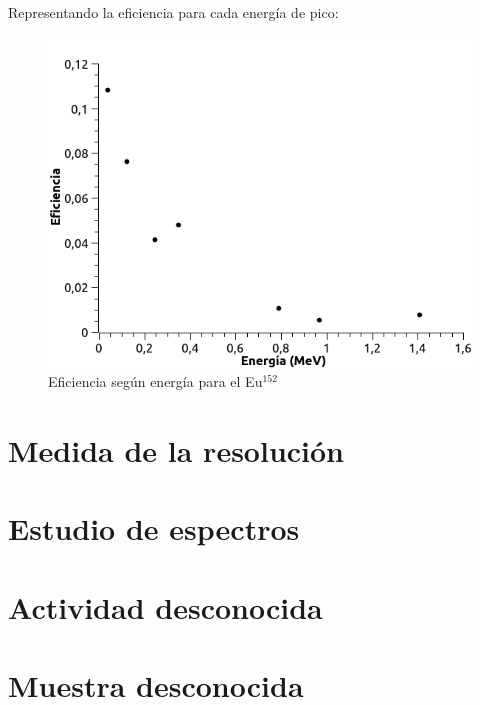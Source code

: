 \documentclass[a4paper,12pt,spanish]{article}
\begin{document}
	Representando la eficiencia para cada energía de pico:
	
	
\begin{figure}[H]
	\centering
	\includegraphics[width=0.7\linewidth]{6_1eficienciaenergia}
	\caption{Eficiencia según energía para el Eu$^{152}$}
	\label{fig:61eficienciaenergia}
\end{figure}
	
	\section{Medida de la resolución}
	
	
	
	\section{Estudio de espectros}
	
	\section{Actividad desconocida}
	
	\section{Muestra desconocida}
	
	
	
	
	
	
	
	
	
	
	
\end{document}
